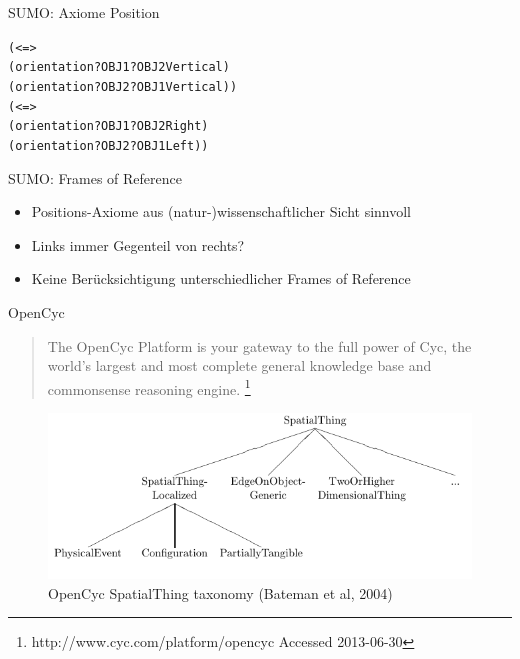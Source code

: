 \documentclass[12pt,a4paper]{beamer}
\begin{document}
\begin{frame}{SUMO: Axiome Position}
\begin{alltt}
(<=>\\
    (orientation ?OBJ1 ?OBJ2 Vertical)\\
    (orientation ?OBJ2 ?OBJ1 Vertical))\\
(<=>\\
    (orientation ?OBJ1 ?OBJ2 Right) \\
    (orientation ?OBJ2 ?OBJ1 Left))
\end{alltt}
\end{frame}



\begin{frame}{SUMO: Frames of Reference}
\begin{itemize}
\item Positions-Axiome aus (natur-)wissenschaftlicher Sicht sinnvoll
\item Links immer Gegenteil von rechts?
\item Keine Berücksichtigung unterschiedlicher Frames of Reference
\end{itemize}
\end{frame}


\begin{frame}{OpenCyc}
\begin{quote}
The OpenCyc Platform is your gateway to the full power of Cyc, the world's largest and most complete general knowledge base and commonsense reasoning engine. \footnote{http://www.cyc.com/platform/opencyc Accessed 2013-06-30}
\end{quote}
\begin{figure}
\includegraphics[scale=0.45]{img/d2_opencyc_SpatialThing_taxonomy.png}
\caption{OpenCyc SpatialThing taxonomy (Bateman et al, 2004)}
\end{figure}
\end{frame}
\end{document}

